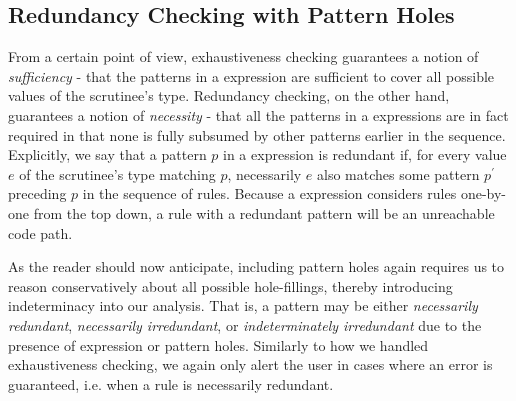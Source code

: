 \subsection{Redundancy Checking with Pattern Holes}\label{sec:redundancy}
From a certain point of view, exhaustiveness checking guarantees a notion of \emph{sufficiency} - that the patterns in a  expression are sufficient to cover all possible values of the scrutinee's type. Redundancy checking, on the other hand, guarantees a notion of \emph{necessity} - that all the patterns in a  expressions are in fact required in that none is fully subsumed by other patterns earlier in the sequence. Explicitly, we say that a pattern $p$ in a  expression is redundant if, for every value $e$ of the scrutinee's type matching $p$, necessarily $e$ also matches some pattern $p^\prime$ preceding $p$ in the sequence of rules. Because a  expression considers rules one-by-one from the top down, a rule with a redundant pattern will be an unreachable code path. 

As the reader should now anticipate, including pattern holes again requires us to reason conservatively about all possible hole-fillings, thereby introducing indeterminacy into our analysis. That is, a pattern may be either \emph{necessarily redundant}, \emph{necessarily irredundant}, or \emph{indeterminately irredundant} due to the presence of expression or pattern holes. Similarly to how we handled exhaustiveness checking, we again only alert the user in cases where an error is guaranteed, i.e. when a rule is necessarily redundant.

